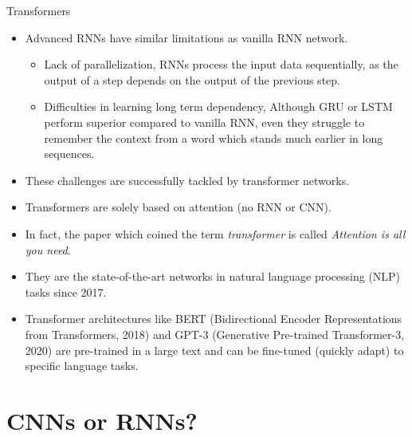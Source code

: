 \begin{vbframe}{Transformers}
  \begin{itemize}
    \item Advanced RNNs have similar limitations as vanilla RNN network.
    \begin{itemize}
      \item Lack of parallelization, RNNs process the input data sequentially, as the output of a step depends on the output of the previous step.
     \item Difficulties in learning long term dependency, Although GRU or LSTM perform superior compared to vanilla RNN, even they struggle to remember the context from a word which stands much earlier in long sequences.
    \end{itemize}
    \item These challenges are successfully tackled by transformer networks.
    
    \framebreak
    
    \item Transformers are solely based on attention (no RNN or CNN).
    \item In fact, the paper which coined the term \textit{transformer} is called \textit{Attention is all you need}.
    \item They are the state-of-the-art networks in natural language processing (NLP) tasks since 2017.
    \item Transformer architectures like BERT (Bidirectional Encoder Representations from Transformers, 2018) and GPT-3 (Generative Pre-trained Transformer-3, 2020) are pre-trained in a large text and can be fine-tuned (quickly adapt) to specific language tasks.
  \end{itemize}
\end{vbframe}



\section{CNNs or RNNs?}

